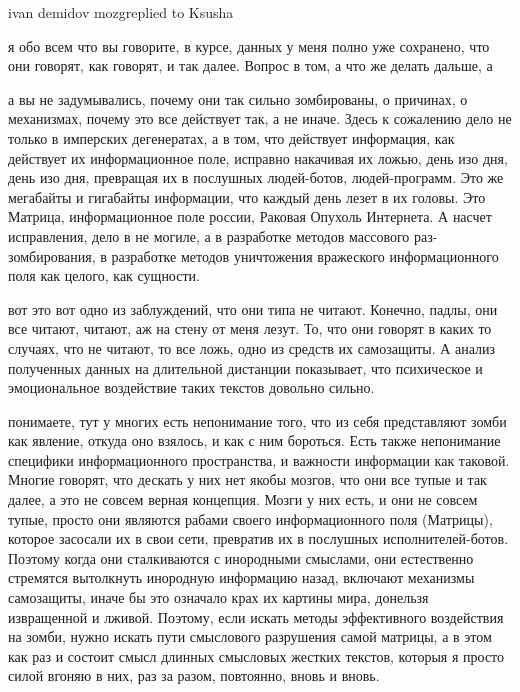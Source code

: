 ivan demidov mozgreplied to Ksusha

я обо всем что вы говорите, в курсе, данных у меня полно уже сохранено, что они
говорят, как говорят, и так далее. Вопрос в том, а что же делать дальше, а

а вы не задумывались, почему они так сильно зомбированы, о причинах, о
механизмах, почему это все действует так, а не иначе. Здесь к сожалению дело не
только в имперских дегенератах, а в том, что действует информация, как
действует их информационное поле, исправно накачивая их ложью, день изо дня,
день изо дня, превращая их в послушных людей-ботов, людей-программ. Это же
мегабайты и гигабайты информации, что каждый день лезет в их головы. Это
Матрица, информационное поле россии, Раковая Опухоль Интернета. А насчет
исправления, дело в не могиле, а в разработке методов массового
раз-зомбирования, в разработке методов уничтожения вражеского информационного
поля как целого, как сущности.

вот это вот одно из заблуждений, что они типа не читают. Конечно, падлы, они
все читают, читают, аж на стену от меня лезут. То, что они говорят в каких то
случаях, что не читают, то все ложь, одно из средств их самозащиты. А анализ
полученных данных на длительной дистанции показывает, что психическое и
эмоциональное воздействие таких текстов довольно сильно.


понимаете, тут у многих есть непонимание того, что из себя представляют зомби
как явление, откуда оно взялось, и как с ним бороться. Есть также непонимание
специфики информационного пространства, и важности информации как таковой.
Многие говорят, что дескать у них нет якобы мозгов, что они все тупые и так
далее, а это не совсем верная концепция. Мозги у них есть, и они не совсем
тупые, просто они являются рабами своего информационного поля (Матрицы),
которое засосали их в свои сети, превратив их в послушных исполнителей-ботов.
Поэтому когда они сталкиваются с инородными смыслами, они естественно стремятся
вытолкнуть инородную информацию назад, включают механизмы самозащиты, иначе бы
это означало крах их картины мира, донельзя извращенной и лживой. Поэтому, если
искать методы эффективного воздействия на зомби, нужно искать пути смыслового
разрушения самой матрицы, а в этом как раз и состоит смысл длинных смысловых
жестких текстов, которыя я просто силой вгоняю в них, раз за разом, повтоянно,
вновь и вновь.

